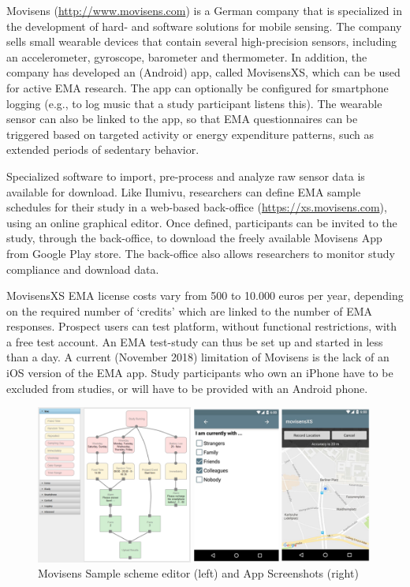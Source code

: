 \documentclass[]{book}
\begin{document}

Movisens (\url{http://www.movisens.com}) is a German company that is
specialized in the development of hard- and software solutions for
mobile sensing. The company sells small wearable devices that contain
several high-precision sensors, including an accelerometer, gyroscope,
barometer and thermometer. In addition, the company has developed an
(Android) app, called MovisensXS, which can be used for active EMA
research. The app can optionally be configured for smartphone logging
(e.g., to log music that a study participant listens this). The wearable
sensor can also be linked to the app, so that EMA questionnaires can be
triggered based on targeted activity or energy expenditure patterns,
such as extended periods of sedentary behavior.

Specialized software to import, pre-process and analyze raw sensor data
is available for download. Like Ilumivu, researchers can define EMA
sample schedules for their study in a web-based back-office
(\url{https://xs.movisens.com}), using an online graphical editor. Once
defined, participants can be invited to the study, through the
back-office, to download the freely available Movisens App from Google
Play store. The back-office also allows researchers to monitor study
compliance and download data.

MovisensXS EMA license costs vary from 500 to 10.000 euros per year,
depending on the required number of `credits' which are linked to the
number of EMA responses. Prospect users can test platform, without
functional restrictions, with a free test account. An EMA test-study can
thus be set up and started in less than a day. A current (November 2018)
limitation of Movisens is the lack of an iOS version of the EMA app.
Study participants who own an iPhone have to be excluded from studies,
or will have to be provided with an Android phone.

\begin{figure}[!t]

{\centering \includegraphics[width=0.8\linewidth]{images/instruments/movisens/movisens} 

}

\caption{Movisens Sample scheme editor (left) and App Screenshots (right)}\label{fig:movisens}
\end{figure}
\end{document}
